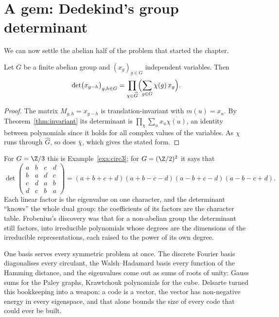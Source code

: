 \section{A gem: Dedekind's group determinant}

We can now settle the abelian half of the problem that started the chapter.

\begin{theorem}[Dedekind]\label{thm:groupdet}
Let $G$ be a finite abelian group and $(x_g)_{g\in G}$ independent variables. Then
\[
\det\bigl(x_{g-h}\bigr)_{g,h\in G}=\prod_{\chi\in\widehat G}\Bigl(\sum_{g\in G}\chi(g)\,x_g\Bigr).
\]
\end{theorem}
\begin{proof}
The matrix $M_{g,h}=x_{g-h}$ is translation-invariant with $m(u)=x_u$. By Theorem~\ref{thm:invariant} its determinant is
$\prod_\chi\sum_ux_u\overline{\chi(u)}$, an identity between polynomials since it holds for all complex values of the
variables. As $\chi$ runs through $\widehat G$, so does $\bar\chi$, which gives the stated form.
\end{proof}

For $G=\Z/3$ this is Example~\ref{exa:circ3}; for $G=(\Z/2)^2$ it says that
\[
\det\begin{pmatrix}a&b&c&d\\b&a&d&c\\c&d&a&b\\d&c&b&a\end{pmatrix}=(a+b+c+d)(a+b-c-d)(a-b+c-d)(a-b-c+d).
\]
Each linear factor is the eigenvalue on one character, and the determinant ``knows'' the whole dual group: the coefficients of
its factors are the character table. Frobenius's discovery was that for a non-abelian group the determinant still factors, into
irreducible polynomials whose degrees are the dimensions of the irreducible representations, each raised to the power of its own
degree.

\begin{beauty}
One basis serves every symmetric problem at once. The discrete Fourier basis diagonalises every circulant, the Walsh--Hadamard
basis every function of the Hamming distance, and the eigenvalues come out as sums of roots of unity: Gauss sums for the Paley
graphs, Krawtchouk polynomials for the cube. Delsarte turned this bookkeeping into a weapon: a code is a vector, the vector has
non-negative energy in every eigenspace, and that alone bounds the size of every code that could ever be built.
\end{beauty}

